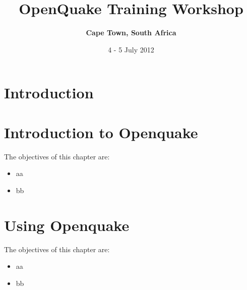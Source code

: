\documentclass[11pt,a4paper,headings=small,dvips]{scrbook}
\newenvironment{myfancybox}{%
  \def\FrameCommand{\fboxsep=\FrameSep \fcolorbox{blue01}{honeydew}}%
  \color{black}\MakeFramed {\FrameRestore}}%
 {\endMakeFramed}
\begin{document}
\setcounter{page}{1}

\begin{titlepage}
	\title{ \textcolor{blue01}{\textsf{\bfseries\Huge 
        OpenQuake Training Workshop\\
        }}}
	\subtitle{ \textcolor{blue01}{\textsf{\bfseries\LARGE
        Cape Town, South Africa}}}
	\date{4 - 5 July 2012}
 
	\publishers{GEM Foundation, Pavia}
\end{titlepage}

\pagestyle{scrheadings}
\maketitle
\renewcommand*\thesection{\arabic{section}}
\renewcommand*\thefigure{\thesection.\arabic{figure}}
\clearpage
\chapter*{Introduction}
\cleardoublepage
\tableofcontents
\cleardoublepage
\chapter{Introduction to Openquake}
\begin{myfancybox}
The objectives of this chapter are:
\begin{itemize}
    \item aa
    \item bb
\end{itemize}
\end{myfancybox}
    
\chapter{Using Openquake}
\begin{myfancybox}
The objectives of this chapter are:
\begin{itemize}
    \item aa
    \item bb
\end{itemize}
\end{myfancybox}
    
\end{document}
